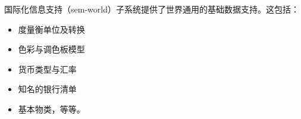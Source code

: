     国际化信息支持（sem-world）子系统提供了世界通用的基础数据支持。这包括：

    \begin{itemize}
        \item  度量衡单位及转换
        \item  色彩与调色板模型
        \item  货币类型与汇率
        \item  知名的银行清单
        \item  基本物类，等等。
    \end{itemize}

    

    

    

    
